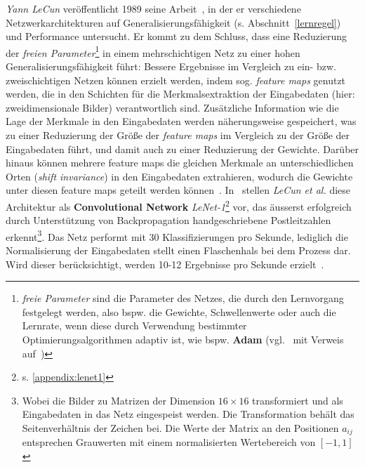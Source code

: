 \textit{Yann LeCun} veröffentlicht 1989 seine Arbeit~\cite{Cun89}, in der er verschiedene Netzwerkarchitekturen auf Generalisierungsfähigkeit (s. Abschnitt~\ref{lernregel}) und Performance untersucht. Er kommt zu dem Schluss, dass eine Reduzierung der \textit{freien Parameter}\footnote{
    \textit{freie Parameter} sind die Parameter des Netzes, die durch den Lernvorgang festgelegt werden, also bspw. die Gewichte, Schwellenwerte oder auch die Lernrate, wenn diese durch Verwendung bestimmter Optimierungsalgorithmen adaptiv ist, wie bspw. \textbf{Adam} (vgl.~\cite[346]{GBC18} mit Verweis auf~\cite{KB17})
} in einem mehrschichtigen Netz zu einer hohen Generalisierungsfähigkeit führt: Bessere Ergebnisse im Vergleich zu  ein- bzw. zweischichtigen Netzen können erzielt werden, indem sog. \textit{feature maps} genutzt werden, die in den Schichten für die Merkmalsextraktion der Eingabedaten (hier: zweidimensionale Bilder) verantwortlich sind.
Zusätzliche Information wie die Lage der Merkmale in den Eingabedaten werden näherungsweise gespeichert, was zu einer Reduzierung der Größe der \textit{feature maps} im Vergleich zu der Größe der Eingabedaten führt, und damit auch zu einer Reduzierung der Gewichte.
Darüber hinaus können mehrere feature maps die gleichen Merkmale an unterschiedlichen Orten (\textit{shift invariance}) in den Eingabedaten extrahieren, wodurch die Gewichte unter diesen feature maps geteilt werden können~\cite[151 f.]{Cun89}.
In~\cite{CBD+89} stellen \textit{LeCun et al.} diese Architektur als \textbf{Convolutional Network} \textit{LeNet-1}\footnote{
    s. \ref{appendix:lenet1}
}  vor\cite[13]{CBBH98}, das äusserst erfolgreich durch Unterstützung von Backpropagation  handgeschriebene Postleitzahlen erkennt\footnote{
    Wobei die Bilder zu Matrizen der Dimension $16 \times 16$ transformiert und als Eingabedaten in das Netz eingespeist werden. Die Transformation behält das Seitenverhältnis der Zeichen bei. Die Werte der Matrix an den Positionen $a_{ij}$ entsprechen Grauwerten mit einem normalisierten Wertebereich von $[-1, 1]$\cite[542]{CBD+89}
}. Das Netz performt mit 30 Klassifizierungen pro Sekunde, lediglich die Normalisierung der Eingabedaten stellt einen Flaschenhals bei dem Prozess dar. Wird dieser berücksichtigt, werden 10-12 Ergebnisse pro Sekunde erzielt~\cite[549]{CBD+89}.\\



